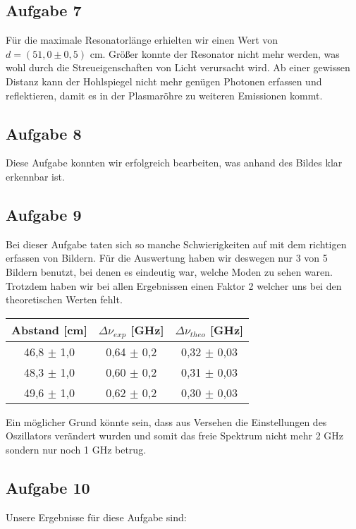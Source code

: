 \subsection*{Aufgabe 7}
Für die maximale Resonatorlänge erhielten wir einen Wert von $d = (51,0\pm 0,5)$ cm. Größer konnte der Resonator nicht mehr werden, was wohl durch die Streueigenschaften von Licht verursacht wird. Ab einer gewissen Distanz kann der Hohlspiegel nicht mehr genügen Photonen erfassen und reflektieren, damit es in der Plasmaröhre zu weiteren Emissionen kommt.

\subsection*{Aufgabe 8}
Diese Aufgabe konnten wir erfolgreich bearbeiten, was anhand des Bildes klar erkennbar ist.

\subsection*{Aufgabe 9}
Bei dieser Aufgabe taten sich so manche Schwierigkeiten auf mit dem richtigen erfassen von Bildern. Für die Auswertung haben wir deswegen nur 3 von 5 Bildern benutzt, bei denen es eindeutig war, welche Moden zu sehen waren. Trotzdem haben wir bei allen Ergebnissen einen Faktor 2 welcher uns bei den theoretischen Werten fehlt.

\begin{center}
\begin{tabular}{c | c | c}
Abstand [cm] & $\Delta \nu_{exp}$ [GHz] & $\Delta \nu_{theo}$ [GHz]\\ \hline
46,8 $\pm$ 1,0 & 0,64 $\pm$ 0,2 & 0,32 $\pm$ 0,03\\ 
48,3 $\pm$ 1,0 & 0,60 $\pm$ 0,2 & 0,31 $\pm$ 0,03\\
49,6 $\pm$ 1,0 & 0,62 $\pm$ 0,2 & 0,30 $\pm$ 0,03\\
\end{tabular}
\end{center}

Ein möglicher Grund könnte sein, dass aus Versehen die Einstellungen des Oszillators verändert wurden und somit das freie Spektrum nicht mehr 2 GHz sondern nur noch 1 GHz betrug. 

\subsection*{Aufgabe 10}
Unsere Ergebnisse für diese Aufgabe sind:

